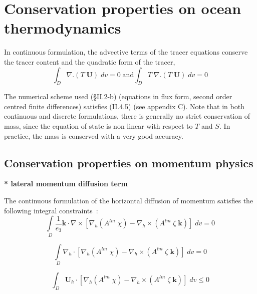 \documentclass[../main/NEMO_manual]{subfiles}
\begin{document}
\section{Conservation properties on ocean thermodynamics}
\label{sec:CONS_Invariant_tra}

In continuous formulation, the advective terms of the tracer equations conserve the tracer content and
the quadratic form of the tracer, \ie
\[
  \int_D {\nabla .\left( {T\;{\textbf{U}}} \right)\;dv} =0
  \;\text{and}
  \int_D {T\;\nabla .\left( {T\;{\textbf{U}}} \right)\;dv} =0
\]

The numerical scheme used ({\S}II.2-b) (equations in flux form, second order centred finite differences) satisfies
(II.4.5) (see appendix C).
Note that in both continuous and discrete formulations, there is generally no strict conservation of mass,
since the equation of state is non linear with respect to $T$ and $S$.
In practice, the mass is conserved with a very good accuracy.

\subsection{Conservation properties on momentum physics}
\label{subsec:CONS_Invariant_dyn_physics}

\textbf{* lateral momentum diffusion term}

The continuous formulation of the horizontal diffusion of momentum satisfies the following integral constraints~:
\[
  \int\limits_D {\frac{1}{e_3 }{\mathrm {\mathbf k}}\cdot \nabla \times \left[ {\nabla
        _h \left( {A^{lm}\;\chi } \right)-\nabla _h \times \left( {A^{lm}\;\zeta
            \;{\mathrm {\mathbf k}}} \right)} \right]\;dv} =0
\]

\[
  \int\limits_D {\nabla _h \cdot \left[ {\nabla _h \left( {A^{lm}\;\chi }
        \right)-\nabla _h \times \left( {A^{lm}\;\zeta \;{\mathrm {\mathbf k}}} \right)}
    \right]\;dv} =0
\]

\[
  \int_D {{\mathrm {\mathbf U}}_h \cdot \left[ {\nabla _h \left( {A^{lm}\;\chi }
        \right)-\nabla _h \times \left( {A^{lm}\;\zeta \;{\mathrm {\mathbf k}}} \right)}
    \right]\;dv} \leqslant 0
\]
\end{document}
